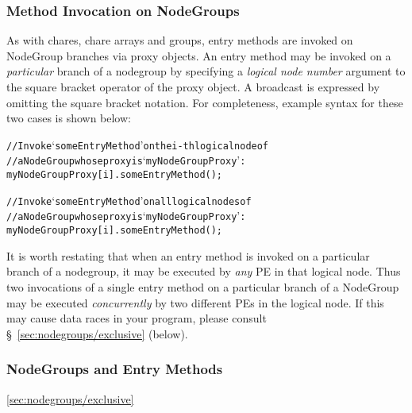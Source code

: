 \subsubsection{Method Invocation on NodeGroups}

As with chares, chare arrays and groups, entry methods are invoked on
NodeGroup branches via proxy objects. 
An entry method may be invoked on a {\em particular} branch of a
nodegroup by specifying a {\em logical node number} argument
to the square bracket operator of the proxy object. A broadcast is expressed
by omitting the square bracket notation. For completeness, example syntax for these
two cases is shown below:

\begin{alltt}
 // Invoke `someEntryMethod' on the i-th logical node of
 // a NodeGroup whose proxy is `myNodeGroupProxy':
 myNodeGroupProxy[i].someEntryMethod();

 // Invoke `someEntryMethod' on all logical nodes of
 // a NodeGroup whose proxy is `myNodeGroupProxy':
 myNodeGroupProxy[i].someEntryMethod();
\end{alltt}

It is worth restating that when an entry method is
invoked on a particular branch of a nodegroup,
it may be executed by {\em any} PE in that logical node. Thus two invocations of
a single entry method on a particular branch of a
NodeGroup may be executed {\em concurrently} by two
different PEs in the logical node. If this may cause data races in your
program, please consult \S~\ref{sec:nodegroups/exclusive} (below).


\subsubsection{NodeGroups and  Entry Methods}
\ref{sec:nodegroups/exclusive}

